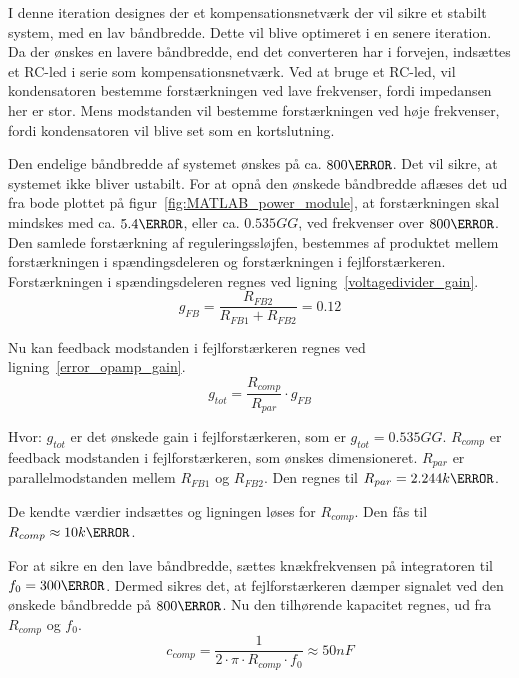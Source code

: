 I denne iteration designes der et kompensationsnetværk der vil sikre et stabilt system, med en lav båndbredde. Dette vil blive optimeret i en senere iteration. 
Da der ønskes en lavere båndbredde, end det converteren har i forvejen, indsættes et RC-led i serie som kompensationsnetværk. Ved at bruge et RC-led, vil kondensatoren bestemme forstærkningen ved lave frekvenser, fordi impedansen her er stor. Mens modstanden vil bestemme forstærkningen ved høje frekvenser, fordi kondensatoren vil blive set som en kortslutning. 

Den endelige båndbredde af systemet ønskes på ca. $800\hertz$. Det vil sikre, at systemet ikke bliver ustabilt. For at opnå den ønskede båndbredde aflæses det ud fra bode plottet på figur~\ref{fig:MATLAB_power_module}, at forstærkningen skal mindskes med ca. $5.4\decibel$, eller ca. $0.535GG$, ved frekvenser over $800\hertz$. Den samlede forstærkning af reguleringssløjfen, bestemmes af produktet mellem forstærkningen i spændingsdeleren og forstærkningen i fejlforstærkeren. Forstærkningen i spændingsdeleren regnes ved ligning~\ref{voltagedivider_gain}.
\begin{equation} \label{voltagedivider_gain}
g_{FB} = \frac{R_{FB2}}{R_{FB1}+R_{FB2}} = 0.12
\end{equation}

\noindent Nu kan feedback modstanden i fejlforstærkeren regnes ved ligning~\ref{error_opamp_gain}. 
\begin{equation} \label{error_opamp_gain}
g_{tot} = \frac{R_{comp}}{R_{par}} \cdot g_{FB}
\end{equation}

\noindent Hvor:
\newline \noindent $g_{tot}$ er det ønskede gain i fejlforstærkeren, som er $g_{tot}=0.535GG$.
\newline \noindent $R_{comp}$ er feedback modstanden i fejlforstærkeren, som ønskes dimensioneret.
\newline \noindent $R_{par}$ er parallelmodstanden mellem $R_{FB1}$ og $R_{FB2}$. Den regnes til $R_{par}=2.244k\ohm$.

\noindent De kendte værdier indsættes og ligningen løses for $R_{comp}$. Den fås til $R_{comp}\approx 10k\ohm$.


\noindent For at sikre en den lave båndbredde, sættes knækfrekvensen på integratoren til $f_0=300\hertz$. Dermed sikres det, at fejlforstærkeren dæmper signalet ved den ønskede båndbredde på $800\hertz$. Nu den tilhørende kapacitet regnes, ud fra $R_{comp}$ og $f_0$.
\begin{equation} \label{c_comp}
c_{comp} = \frac{1}{2\cdot \pi \cdot R_{comp} \cdot f_0} \approx 50nF
\end{equation}

